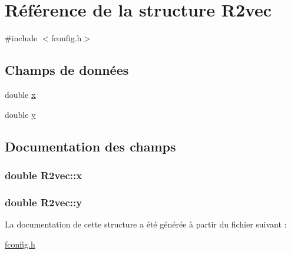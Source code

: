 \hypertarget{structR2vec}{\section{\-Référence de la structure \-R2vec}
\label{structR2vec}
}


{\ttfamily \#include $<$fconfig.\-h$>$}

\subsection*{\-Champs de données}
\begin{DoxyCompactItemize}
\item 
double \hyperlink{structR2vec_a510ea829f38b43f66da061c09b847299}{x}
\item 
double \hyperlink{structR2vec_acda9b7268208078fa00bbed94ccb4484}{y}
\end{DoxyCompactItemize}


\subsection{\-Documentation des champs}
\hypertarget{structR2vec_a510ea829f38b43f66da061c09b847299}{
\subsubsection[{x}]{\setlength{\rightskip}{0pt plus 5cm}double {\bf \-R2vec\-::x}}}\label{structR2vec_a510ea829f38b43f66da061c09b847299}
\hypertarget{structR2vec_acda9b7268208078fa00bbed94ccb4484}{
\subsubsection[{y}]{\setlength{\rightskip}{0pt plus 5cm}double {\bf \-R2vec\-::y}}}\label{structR2vec_acda9b7268208078fa00bbed94ccb4484}


\-La documentation de cette structure a été générée à partir du fichier suivant \-:\begin{DoxyCompactItemize}
\item 
\hyperlink{fconfig_8h}{fconfig.\-h}\end{DoxyCompactItemize}
